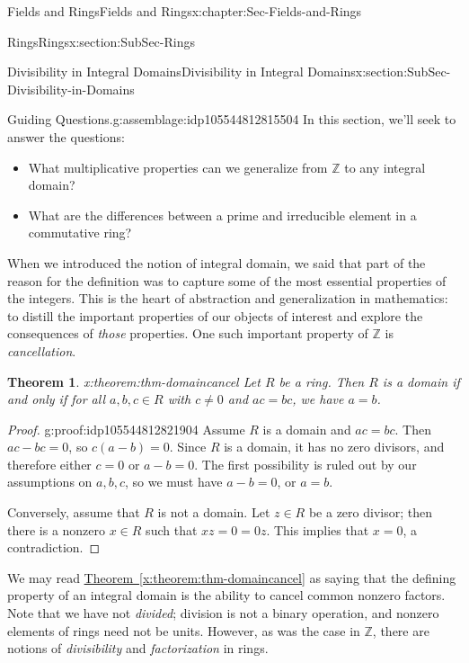 \documentclass[oneside,10pt,]{book}
\newcommand{\xreffont}{\relax}
\numberwithin{equation}{section}
\def\Z{{\mathbb Z}}
\newtheorem{theorem}{Theorem}[section]
\begin{document}
\begin{chapterptx}{Fields and Rings}{}{Fields and Rings}{}{}{x:chapter:Sec-Fields-and-Rings}
\begin{sectionptx}{Rings}{}{Rings}{}{}{x:section:SubSec-Rings}
\end{sectionptx}
%
%
\typeout{************************************************}
\typeout{************************************************}
%
\begin{sectionptx}{Divisibility in Integral Domains}{}{Divisibility in Integral Domains}{}{}{x:section:SubSec-Divisibility-in-Domains}
\begin{assemblage}{Guiding Questions.}{g:assemblage:idp105544812815504}%
In this section, we'll seek to answer the questions: %
\begin{itemize}[label=\textbullet]
\item{}What multiplicative properties can we generalize from \(\Z\) to any integral domain?%
\item{}What are the differences between a prime and irreducible element in a commutative ring?%
\end{itemize}
%
\end{assemblage}
When we introduced the notion of integral domain, we said that part of the reason for the definition was to capture some of the most essential properties of the integers. This is the heart of abstraction and generalization in mathematics: to distill the important properties of our objects of interest and explore the consequences of \emph{those} properties. One such important property of \(\Z\) is \emph{cancellation}.%
\begin{theorem}{}{}{x:theorem:thm-domaincancel}%
Let \(R\) be a ring. Then \(R\) is a domain if and only if for all \(a,b,c\in R\) with \(c\ne 0\) and \(ac = bc\), we have \(a = b\).%
\end{theorem}
\begin{proof}{}{g:proof:idp105544812821904}
Assume \(R\) is a domain and \(ac = bc\). Then \(ac - bc = 0\), so \(c(a-b) = 0\). Since \(R\) is a domain, it has no zero divisors, and therefore either \(c = 0\) or \(a-b=0\). The first possibility is ruled out by our assumptions on \(a,b,c\), so we must have \(a-b = 0\), or \(a =b\).%
\par
Conversely, assume that \(R\) is not a domain. Let \(z\in R\) be a zero divisor; then there is a nonzero \(x\in R\) such that \(xz = 0 = 0 z\). This implies that \(x = 0\), a contradiction.%
\end{proof}
We may read \hyperref[x:theorem:thm-domaincancel]{Theorem~{\xreffont\ref{x:theorem:thm-domaincancel}}} as saying that the defining property of an integral domain is the ability to cancel common nonzero factors. Note that we have not \emph{divided}; division is not a binary operation, and nonzero elements of rings need not be units. However, as was the case in \(\Z\), there are notions of \emph{divisibility} and \emph{factorization} in rings.%

\end{sectionptx}
\end{chapterptx}
\end{document}
